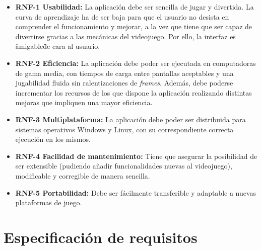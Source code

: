 \begin{itemize}
\tightlist
\item 
	\textbf{RNF-1 Usabilidad:} La aplicación debe ser sencilla de jugar y divertida. La curva de aprendizaje ha de ser baja para que el usuario no desista en comprender el funcionamiento y mejorar, a la vez que tiene que ser capaz de divertirse gracias a las mecánicas del videojuego. Por ello, la interfaz es \"amigable\" de cara al usuario.

\item 
	\textbf{RNF-2 Eficiencia:} La aplicación debe poder ser ejecutada en computadoras de gama media, con tiempos de carga entre pantallas aceptables y una jugabilidad fluida sin ralentizaciones de \textit{frames}. Además, debe poderse incrementar los recursos de los que dispone la aplicación realizando distintas mejoras que impliquen una mayor eficiencia.
	
\item 
	\textbf{RNF-3 Multiplataforma:} La aplicación debe poder ser distribuida para sistemas operativos Windows y Linux, con su correspondiente correcta ejecución en los mismos. 
	
\item 
	\textbf{RNF-4 Facilidad de mantenimiento:} Tiene que asegurar la posibilidad de ser extensible (pudiendo añadir funcionalidades nuevas al videojuego), modificable y corregible de manera sencilla.

\item 
	\textbf{RNF-5 Portabilidad:} Debe ser fácilmente transferible y adaptable a nuevas plataformas de juego.

\end{itemize}
\section{Especificación de requisitos}


